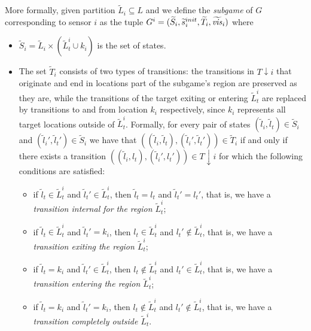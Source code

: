 

More formally, given partition $\widetilde{L}_i \subseteq L$ and we define the \emph{subgame} of $G$ corresponding to sensor $i$ as the tuple $G^i = (\widetilde{S}_i,\widetilde{s}_i^{init},\widetilde{T}_i,\widetilde{\mathit{vis}}_i)$  where
\begin{itemize}
\item $\widetilde{S}_i= \widetilde{L}_i \times (\widetilde{L}^i_t \cup k_i)$ is the set of states.
\item The set $\widetilde{T}_i$ consists of two types of transitions: the transitions in $T{\downarrow } i$ that originate and end in locations part of the subgame's region are preserved as they are, while the transitions of the target exiting or entering $\widetilde{L}^i_t$ are replaced by transitions to and from location $k_i$ respectively, since $k_i$ represents all target locations outside of  $\widetilde{L}^i_t$. 
Formally, for every pair of states $(\widetilde{l}_i,\widetilde{l}_t) \in \widetilde{S}_i$ and $(\widetilde{l}_i',\widetilde{l}_t') \in \widetilde{S}_i$ we have that $((\widetilde{l}_i,\widetilde l_t),(\widetilde{l}_i',\widetilde l_t')) \in \widetilde T_i$ if and only if there exists a transition
 $((\widetilde{l}_i,l_t),(\widetilde{l}_i',l_t')) \in T{\downarrow}i$ for which the following conditions are satisfied:
 \begin{itemize}
 \item if $\widetilde l_t \in \widetilde L_t ^i$ and $\widetilde l_t' \in \widetilde L_t ^i$, then 
 $\widetilde l_t = l_t$ and $\widetilde l_t'= l_t'$, that is, we have a \emph{transition internal for the region $\widetilde L_t^i$};
 \item if $\widetilde l_t \in \widetilde L_t ^i$ and $\widetilde l_t' =  k_i$, then 
 $l_t \in \widetilde L_t^i$ and $l_t' \not\in \widetilde L_t^i$, that is, we have a \emph{transition exiting the region $\widetilde L_t^i$}; 
 \item if $\widetilde l_t= k_i$ and $\widetilde l_t' \in  \widetilde L_t ^i$, then 
 $l_t \not \in \widetilde L_t^i$ and $l_t' \in \widetilde L_t^i$, that is, we have a \emph{transition entering the region $\widetilde L_t^i$}; 
 \item if $\widetilde l_t= k_i$ and $\widetilde l_t' =  k_i$, then 
 $l_t \not \in \widetilde L_t^i$ and $l_t' \not\in \widetilde L_t^i$, that is, we have a \emph{transition completely outside $\widetilde L_t^i$}.
\end{itemize}  


\end{itemize}
